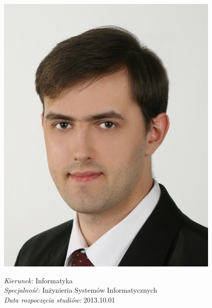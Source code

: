 \newpage



\begin{minipage}[t]{0.3\textwidth}
\includegraphics{my-photo.jpg}
\end{minipage}
\begin{minipage}[t]{0.7\textwidth}
\vspace{-45mm}
\emph{Kierunek:} \hspace{10mm} Informatyka
\vspace{5mm} \\
\emph{Specjalność:} \hspace{5mm} Inżynieria Systemów Informatycznych
\vspace{5mm} \\
\emph{Data rozpoczęcia studiów:} \hspace{5mm} 2013.10.01
\end{minipage}

